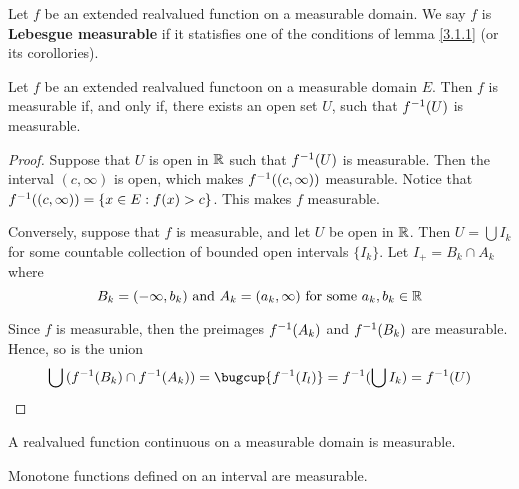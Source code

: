 \begin{definition}
    Let $f$ be an extended realvalued function on a measurable domain. We say
    $f$ is  \textbf{Lebesgue measurable} if it statisfies one of the conditions
    of lemma \ref{3.1.1} (or its corollories).
\end{definition}

\begin{lemma}\label{3.1.2}
    Let $f$ be an extended realvalued functoon on a measurable domain $E$. Then
    $f$ is measurable if, and only if, there exists an open set $U$, such that
    $f^{-1}(U)$ is measurable.
\end{lemma}
\begin{proof}
    Suppose that $U$ is open in  $\mathbb{R}$ such that  $f^{-1}(U)$ is measurable.
    Then the interval $(c,\infty)$ is open, which makes $f^{-1}((c,\infty))$
    measurable. Notice that $f^{-1}((c,\infty))=\{x \in E : f(x)>c\}$. This
    makes $f$ measurable.

    Conversely, suppose that  $f$ is measurable, and let  $U$ be open in $\mathbb{R}$.
    Then $U=\bigcup{I_k}$ for some countable collection of bounded open
    intervals $\{I_k\}$. Let $I_+=B_k \cap A_k$ where
    \begin{equation*}
        B_k=(-\infty, b_k) \text{ and } A_k=(a_k, \infty) \text{ for some
        } a_k,b_k \in \mathbb{R}
    \end{equation*}

    Since $f$ is measurable, then the preimages $f^{-1}(A_k)$ and
    $f^{-1}(B_k)$ are measurable. Hence, so is the union
    \begin{equation*}
        \bigcup{(\inv{f}(B_k) \cap \inv{f}(A_k))}=\bugcup{\inv{f}(I_l)}
        =\inv{f}(\bigcup{I_k})=\inv{f}(U)
    \end{equation*}
\end{proof}
\begin{corollary}
    A realvalued function continuous on a measurable domain is measurable.
\end{corollary}

\begin{lemma}\label{3.1.3}

    Monotone functions defined on an interval are measurable.
\end{lemma}

